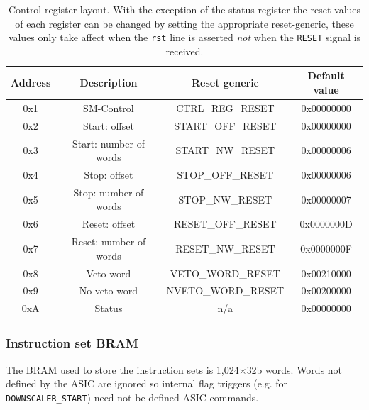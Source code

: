 \begin{table}
  \begin{center}
    \begin{tabular}{c|c | c |c}
      Address & Description             & Reset generic      & Default value  \\
      \hline                    
      0x1     & SM-Control              & CTRL\_REG\_RESET   & 0x00000000     \\ 
      0x2     & Start: offset           & START\_OFF\_RESET  & 0x00000000     \\  
      0x3     & Start: number of words  & START\_NW\_RESET   & 0x00000006     \\ 
      0x4     & Stop: offset            & STOP\_OFF\_RESET   & 0x00000006     \\ 
      0x5     & Stop: number of words   & STOP\_NW\_RESET    & 0x00000007     \\ 
      0x6     & Reset: offset           & RESET\_OFF\_RESET  & 0x0000000D     \\ 
      0x7     & Reset: number of words  & RESET\_NW\_RESET   & 0x0000000F     \\ 
      0x8     & Veto word               & VETO\_WORD\_RESET  & 0x00210000     \\ 
      0x9     & No-veto word            & NVETO\_WORD\_RESET & 0x00200000     \\ 
      0xA     & Status                  & n/a                & 0x00000000     \\ 
    \end{tabular}
  \end{center}
  \caption{Control register layout. With the exception of the status register the reset values of each register can be changed by setting the appropriate reset-generic, these values only take affect when the \texttt{rst} line is asserted \emph{not} when the \texttt{RESET} signal is received.}
  \label{tab:ctrl_reg_default}
\end{table}

\subsubsection{Instruction set BRAM} %
\label{sub:tx_bram}
The BRAM used to store the instruction sets is 1,024\(\times\)32b words. Words not defined by the ASIC are ignored so internal flag triggers (e.g. for \texttt{DOWNSCALER\_START}) need not be defined ASIC commands.

